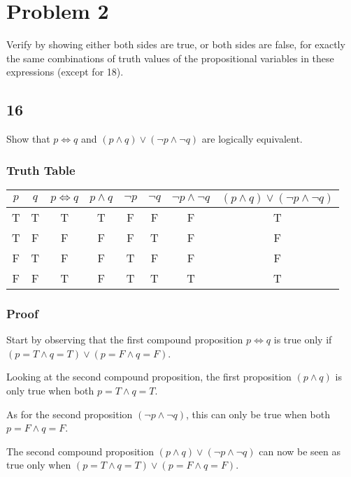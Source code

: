 \documentclass{article}
\begin{document}
\section{Problem 2}

Verify by showing either both sides are true, or both sides are false, for exactly the same combinations of truth values of the propositional variables in these expressions (except for 18).

\subsection{16}

Show that $ p \iff q $ and $ ( p \land q ) \lor ( \neg p \land \neg q ) $ are logically equivalent.

\subsubsection{Truth Table}

\begin{tabular}{ | c | c | c | c | c | c | c | c | }
	$ p $ & $ q $ & $ p \iff q $ & $ p \land q $ & $ \neg p $ & $ \neg q $ & $ \neg p \land \neg q $ & $ ( p \land q ) \lor ( \neg p \land \neg q ) $ \\
	\hline
	T & T & T & T & F & F & F & T \\
	T & F & F & F & F & T & F & F \\
	F & T & F & F & T & F & F & F \\
	F & F & T & F & T & T & T & T
\end{tabular}

\subsubsection{Proof}

Start by observing that the first compound proposition $ p \iff q $ is true only if $ ( p = T \land q = T ) \lor ( p = F \land q = F ) $.

Looking at the second compound proposition, the first proposition $ (p \land q) $ is only true when both $ p = T \land q = T $.

As for the second proposition $ ( \neg p \land \neg q ) $, this can only be true when both $ p = F \land q = F $.

The second compound proposition $ ( p \land q ) \lor ( \neg p \land \neg q ) $ can now be seen as true only when $ ( p = T \land q = T ) \lor ( p = F \land q = F ) $.
\end{document}
